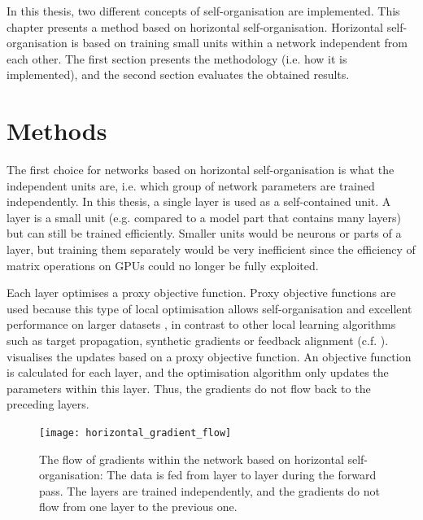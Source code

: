 In this thesis, two different concepts of self-organisation are implemented.
This chapter presents a method based on horizontal self-organisation.
Horizontal self-organisation is based on training small units within a network independent from each other.
The first section presents the methodology (i.e. how it is implemented), and the second section evaluates the obtained results.


\section{Methods}
The first choice for networks based on horizontal self-organisation is what the independent units are, i.e. which group of network parameters are trained independently.
In this thesis, a single layer is used as a self-contained unit. A layer is a small unit (e.g. compared to a model part that contains many layers) but can still be trained efficiently.
Smaller units would be neurons or parts of a layer, but training them separately would be very inefficient since the efficiency of matrix operations on GPUs could no longer be fully exploited.

Each layer optimises a proxy objective function.
Proxy objective functions are used because this type of local optimisation allows self-organisation and excellent performance on larger datasets , in contrast to other local learning algorithms such as target propagation, synthetic gradients or feedback alignment (c.f. ). 
  visualises the updates based on a proxy objective function.
An objective function is calculated for each layer, and the optimisation algorithm only updates the parameters within this layer.
Thus, the gradients do not flow back to the preceding layers.

\begin{figure}[h]
    \centering
    \texttt{[image: horizontal\_gradient\_flow]}
    \caption[The flow of gradients within the network based on horizontal self-organisation]{The flow of gradients within the network based on horizontal self-organisation: The data is fed from layer to layer during the forward pass. The layers are trained independently, and the gradients do not flow from one layer to the previous one.}
\end{figure}

